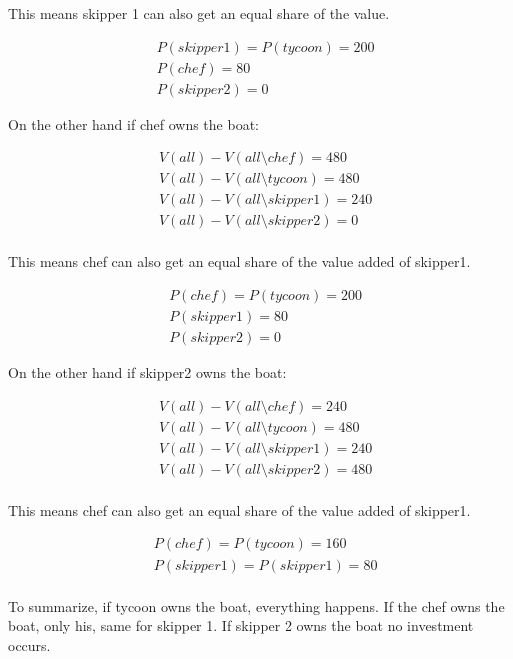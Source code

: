 \documentclass[12pt]{report}
\numberwithin{equation}{section}
\begin{document}
This means skipper 1 can also get an equal share of the value. 

\begin{align*}
&P(skipper1)=P(tycoon) = 200 \\
&P(chef) = 80 \\
&P(skipper2)=0
\end{align*}

On the other hand if chef owns the boat: 

\begin{align*}
&V(all)-V(all \setminus chef)= 480 \\
&V(all)-V(all \setminus tycoon)= 480  \\
&V(all)-V(all \setminus skipper1)= 240 \\
&V(all)-V(all \setminus skipper2) = 0 \\
\end{align*}

This means chef can also get an equal share of the value added of skipper1. 

\begin{align*}
&P(chef)=P(tycoon) = 200 \\
&P(skipper1) = 80 \\
&P(skipper2)=0
\end{align*}

On the other hand if skipper2 owns the boat: 

\begin{align*}
&V(all)-V(all \setminus chef)= 240 \\
&V(all)-V(all \setminus tycoon)= 480  \\
&V(all)-V(all \setminus skipper1)= 240 \\
&V(all)-V(all \setminus skipper2) = 480 \\
\end{align*}

This means chef can also get an equal share of the value added of skipper1. 

\begin{align*}
&P(chef)=P(tycoon) = 160 \\
&P(skipper1)=P(skipper1) = 80 \\
\end{align*}

To summarize, if tycoon owns the boat, everything happens. If the chef owns the boat, only his, same for skipper 1. If skipper 2 owns the boat no investment occurs. 


\end{document}
